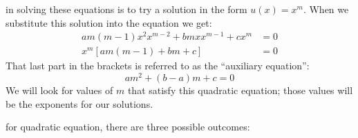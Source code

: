 \vspace{4.0cm}

 in solving these equations is to try a solution in the form $u(x)=x^m$.  When we substitute this solution into the equation we get:
\begin{align*}
am(m-1)x^2x^{m-2}+bmxx^{m-1}+cx^m &=0 \\
x^m\left[am(m-1)+bm+c \right]&=0
\end{align*}
That last part in the brackets is referred to as the ``auxiliary equation'':
\begin{equation}
am^2+(b-a)m+c=0
\label{eq:CE-aux}
\end{equation}
We will look for values of $m$ that satisfy this quadratic equation; those values will be the exponents for our solutions.

 for quadratic equation, there are three possible outcomes: 

